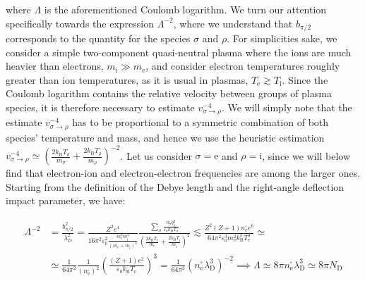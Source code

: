 where $\Lambda$ is the aforementioned Coulomb logarithm. We turn our attention specifically towards the expression $\Lambda^{-2}$, where we understand that $b_{\pi/2}$ corresponds to the quantity for the species $\sigma$ and $\rho$. For simplicities sake, we consider a simple two-component quasi-neutral plasma where the ions are much heavier than electrons, $m_\text{i}\gg m_\text{e}$, and consider electron temperatures roughly greater than ion temperatures, as it is usual in plasmas, $T_{\mathrm{e}}\gtrsim T_{\mathrm{i}}$. Since the Coulomb logarithm contains the relative velocity between groups of plasma species, it is therefore necessary to estimate $v_{\sigma\to\rho}^{-4}$. We will simply note that the estimate $v_{\sigma\to\rho}^{-4}$ has to be proportional to a symmetric combination of both species' temperature and mass, and hence we use the heuristic estimation $v_{\sigma\to\rho}^{-4}\simeq \left(\frac{2k_\text{B}T_\sigma}{m_\sigma}+\frac{2k_\text{B}T_\rho}{m_\rho}\right)^{-2}$. Let us consider $\sigma=\mathrm{e}$ and $\rho=\mathrm{i}$, since we will below find that electron-ion and electron-electron frequencies are among the larger ones. Starting from the definition of the Debye length and the right-angle deflection impact parameter, we have:

\begin{align*}
    \Lambda^{-2}&=\frac{b_{\pi/2}^2}{\lambda_{D}^2}=\frac{Z^2e^4}{16\pi^2 \varepsilon_0^2 \frac{m_{\mathrm{e}}^2m_{\mathrm{i}}^2}{\left(m_{\mathrm{e}}+m_{\mathrm{i}}\right)^2}}\frac{\sum_{\sigma}\frac{n_\sigma^\square q_\sigma^2}{\varepsilon_0 k_\text{B}T_\sigma}}{\left(\frac{2k_\text{B}T_{\mathrm{e}}}{m_{\mathrm{e}}}+\frac{2k_\text{B}T_{\mathrm{i}}}{m_{\mathrm{i}}}\right)^2}\lesssim \frac{Z^2(Z+1)n_{\mathrm{e}}^\square e^6}{64\pi^2 \varepsilon_0^3 m_{\mathrm{e}}^2 k_\text{B}^3T_{\mathrm{e}}^3}\simeq\\
    &\simeq \frac{1}{64\pi^2}\frac{1}{\left(n_{\mathrm{e}}^\square\right)^{2}}\left(\frac{\left(Z+1\right)e^2}{\varepsilon_0 k_\text{B}T_{\mathrm{e}}}\right)^3=\frac{1}{64\pi^2}\left(n_{\mathrm{e}}^\square \lambda_{\mathrm{D}}^3\right)^{-2}\implies\Lambda\simeq 8\pi n_{\mathrm{e}}^\square\lambda_{\mathrm{D}}^3\simeq 8\pi N_{\mathrm{D}}
\end{align*}

